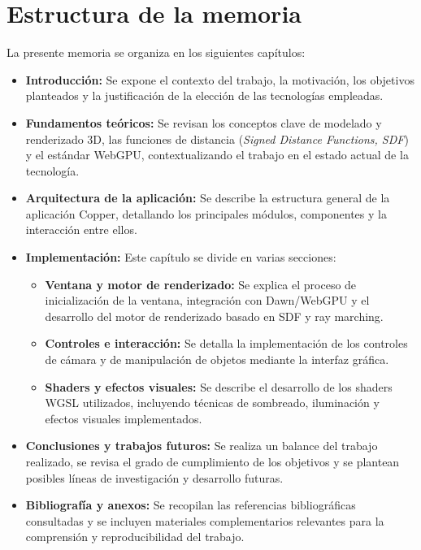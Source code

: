 \section{Estructura de la memoria}

La presente memoria se organiza en los siguientes capítulos:

\begin{itemize}
    \item \textbf{Introducción:} Se expone el contexto del trabajo, la motivación, los objetivos planteados y la justificación de la elección de las tecnologías empleadas.
    \item \textbf{Fundamentos teóricos:} Se revisan los conceptos clave de modelado y renderizado 3D, las funciones de distancia (\textit{Signed Distance Functions, SDF}) y el estándar WebGPU, contextualizando el trabajo en el estado actual de la tecnología.
    \item \textbf{Arquitectura de la aplicación:} Se describe la estructura general de la aplicación Copper, detallando los principales módulos, componentes y la interacción entre ellos.
    \item \textbf{Implementación:} Este capítulo se divide en varias secciones:
    \begin{itemize}
        \item \textbf{Ventana y motor de renderizado:} Se explica el proceso de inicialización de la ventana, integración con Dawn/WebGPU y el desarrollo del motor de renderizado basado en SDF y ray marching.
        \item \textbf{Controles e interacción:} Se detalla la implementación de los controles de cámara y de manipulación de objetos mediante la interfaz gráfica.
        \item \textbf{Shaders y efectos visuales:} Se describe el desarrollo de los shaders WGSL utilizados, incluyendo técnicas de sombreado, iluminación y efectos visuales implementados.
    \end{itemize}
    \item \textbf{Conclusiones y trabajos futuros:} Se realiza un balance del trabajo realizado, se revisa el grado de cumplimiento de los objetivos y se plantean posibles líneas de investigación y desarrollo futuras.
    \item \textbf{Bibliografía y anexos:} Se recopilan las referencias bibliográficas consultadas y se incluyen materiales complementarios relevantes para la comprensión y reproducibilidad del trabajo.
\end{itemize}